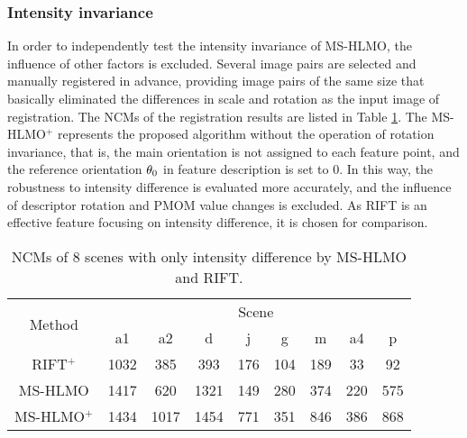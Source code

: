 \subsubsection{Intensity invariance}
In order to independently test the intensity invariance of MS-HLMO, the influence of other factors is excluded. Several image pairs are selected and manually registered in advance, providing image pairs of the same size that basically eliminated the differences in scale and rotation as the input image of registration. The NCMs of the registration results are listed in Table \ref{tbl:intensity}.
The MS-HLMO$^+$ represents the proposed algorithm without the operation of rotation invariance, that is, the main orientation is not assigned to each feature point, and the reference orientation ${\theta _{\rm{0}}}$ in feature description is set to 0. In this way, the robustness to intensity difference is evaluated more accurately, and the influence of descriptor rotation and PMOM value changes is excluded. As RIFT is an effective feature focusing on intensity difference, it is chosen for comparison.

\begin{table}[h!]
 \centering
 \setlength{\tabcolsep}{1.5mm}
 \caption{NCMs of 8 scenes with only intensity difference by MS-HLMO and RIFT.}
 \label{tbl:intensity}
 \begin{tabular}{ccccccccc}
  \toprule
  \multirow{2}{*}{Method} & \multicolumn{8}{c}{Scene}\\
                            \cline{2-9} & a1 & a2 & d & j & g & m & a4 & p \\
  \midrule
   RIFT$^+$    & 1032 &  385 &  393 & 176 & 104 & 189 &  33 &  92 \\
   MS-HLMO     & 1417 &  620 & 1321 & 149 & 280 & 374 & 220 & 575 \\
   MS-HLMO$^+$ & 1434 & 1017 & 1454 & 771 & 351 & 846 & 386 & 868 \\
  \bottomrule
 \end{tabular}
\end{table}

